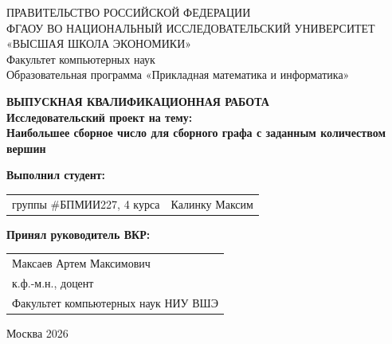 \begin{titlepage}
\newpage

{
\begin{center}
ПРАВИТЕЛЬСТВО РОССИЙСКОЙ ФЕДЕРАЦИИ\\
ФГАОУ ВО НАЦИОНАЛЬНЫЙ ИССЛЕДОВАТЕЛЬСКИЙ УНИВЕРСИТЕТ\\
«ВЫСШАЯ ШКОЛА ЭКОНОМИКИ»
\\
\bigskip
Факультет компьютерных наук\\
Образовательная программа «Прикладная математика и информатика»
\end{center}
}

\vspace{7em}

\begin{center}
{\bf ВЫПУСКНАЯ КВАЛИФИКАЦИОННАЯ РАБОТА}\\
{\bf Исследовательский проект на тему:}\\
{\bf Наибольшее сборное число для сборного графа с заданным количеством вершин}\\
\end{center}

\vspace{2em}

{\bf Выполнил студент: \vspace{2mm}}

{
\begin{tabular}{l@{\hskip 1.5cm}l}
группы \#БПМИИ227, 4 курса & Калинку Максим 
\end{tabular}}

\vspace{1em}
{\bf Принял руководитель ВКР: \vspace{2mm}}

{
\begin{tabular}{l}
Максаев Артем Максимович\\
к.ф.-м.н., доцент\\
Факультет компьютерных наук НИУ ВШЭ 
\end{tabular}}

\vspace{\fill}

\begin{center}
Москва 2026
\end{center}

\end{titlepage}